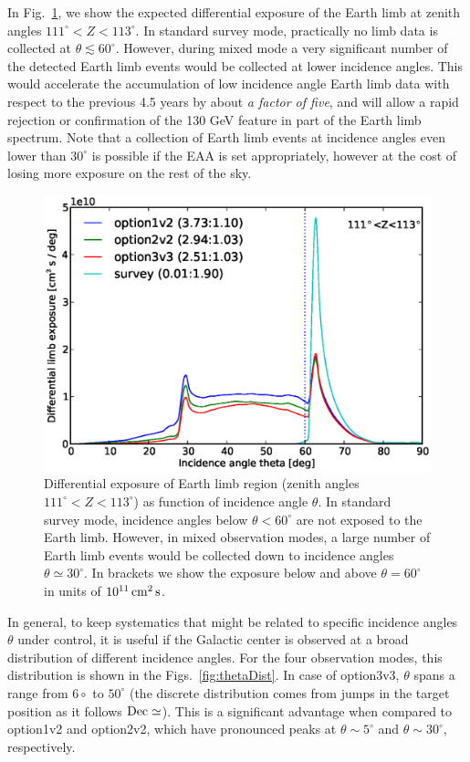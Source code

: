 \documentclass[aps,prd,superscriptaddress,nofootinbib,fixlfloat, 12pt]{revtex4-1}
\begin{document}
In Fig.~\ref{fig:limb_exposure}, we show the expected differential exposure of
the Earth limb at zenith angles $111^\circ<Z<113^\circ$. In standard survey
mode, practically no limb data is collected at $\theta\lesssim60^\circ$.
However, during mixed mode a very significant number of the detected Earth
limb events would be collected at lower incidence angles. This would
accelerate the accumulation of low incidence angle Earth limb data with
respect to the previous 4.5 years by about \emph{a factor of five}, and will
allow a rapid rejection or confirmation of the 130 GeV feature in part of the
Earth limb spectrum. Note that a collection of Earth limb events at incidence
angles even lower than $30^\circ$ is possible if the EAA is set appropriately,
however at the cost of losing more exposure on the rest of the sky.

\begin{figure}[t]
  \begin{center}
    \includegraphics[width=0.6\linewidth]{plots/limb_exposure.eps}
    \vspace{-0.5cm}
  \end{center}
  \caption{Differential exposure of Earth limb region (zenith angles
    $111^\circ<Z<113^\circ$) as function of incidence angle $\theta$. In
    standard survey mode, incidence angles below $\theta<60^\circ$ are not
    exposed to the Earth limb. However, in mixed observation modes, a
    large number of Earth limb events would be collected down to incidence
    angles $\theta\simeq30^\circ$. In brackets we show the exposure below and
  above $\theta=60^\circ$ in units of $10^{11}\rm\,cm^2\,s$.}
  \label{fig:limb_exposure}
\end{figure}

In general, to keep systematics that might be related to specific incidence
angles $\theta$ under control, it is useful if the Galactic center is observed
at a broad distribution of different incidence angles. For the four
observation modes, this distribution is shown in the
Figs.~\ref{fig:thetaDist}. In case of option3v3, $\theta$ spans a range from
$6\circ$ to $50^\circ$ (the discrete distribution comes from jumps in the
target position as it follows $\rm Dec\simeq$). This is a significant advantage
when compared to option1v2 and option2v2, which have pronounced peaks at
$\theta\sim5^\circ$ and $\theta\sim30^\circ$, respectively.
\end{document}
